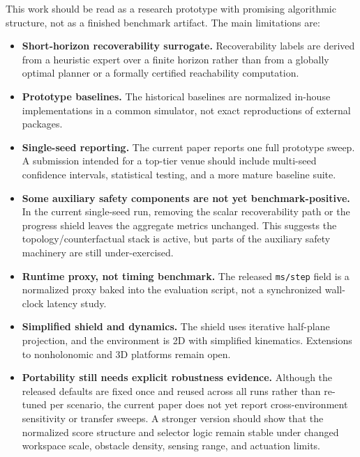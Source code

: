 \documentclass[journal]{IEEEtran}
\begin{document}
This work should be read as a research prototype with promising
algorithmic structure, not as a finished benchmark artifact.
The main limitations are:
\begin{itemize}
    \item \textbf{Short-horizon recoverability surrogate.}
    Recoverability labels are derived from a heuristic expert over a
    finite horizon rather than from a globally optimal planner or a
    formally certified reachability computation.

    \item \textbf{Prototype baselines.}
    The historical baselines are normalized in-house implementations in
    a common simulator, not exact reproductions of external packages.

    \item \textbf{Single-seed reporting.}
    The current paper reports one full prototype sweep. A submission
    intended for a top-tier venue should include multi-seed confidence
    intervals, statistical testing, and a more mature baseline suite.

    \item \textbf{Some auxiliary safety components are not yet
    benchmark-positive.}
    In the current single-seed run, removing the scalar recoverability
    path or the progress shield leaves the aggregate metrics unchanged.
    This suggests the topology/counterfactual stack is active, but
    parts of the auxiliary safety machinery are still under-exercised.

    \item \textbf{Runtime proxy, not timing benchmark.}
    The released \texttt{ms/step} field is a normalized proxy baked into
    the evaluation script, not a synchronized wall-clock latency study.

    \item \textbf{Simplified shield and dynamics.}
    The shield uses iterative half-plane projection, and the environment
    is 2D with simplified kinematics. Extensions to nonholonomic and 3D
    platforms remain open.

    \item \textbf{Portability still needs explicit robustness evidence.}
    Although the released defaults are fixed once and reused across all
    runs rather than re-tuned per scenario, the current paper does not
    yet report cross-environment sensitivity or transfer sweeps. A
    stronger version should show that the normalized score structure and
    selector logic remain stable under changed workspace scale,
    obstacle density, sensing range, and actuation limits.
\end{itemize}
\end{document}
